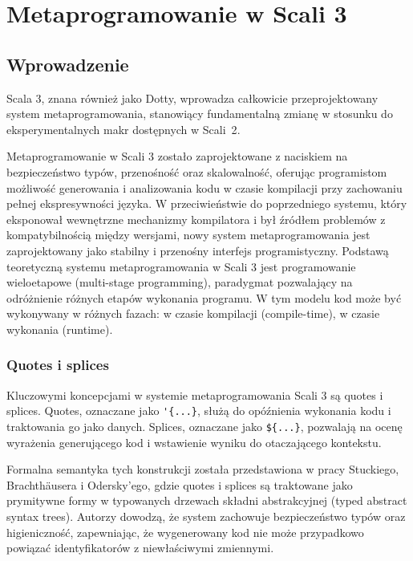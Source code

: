 \chapter{Metaprogramowanie w Scali 3}\label{ch:metaprogramowanie-w-scali-3}


\section{Wprowadzenie}\label{sec:wprowadzenie}
Scala 3, znana również jako Dotty, wprowadza całkowicie przeprojektowany system metaprogramowania, stanowiący fundamentalną zmianę w stosunku do eksperymentalnych makr dostępnych w Scali~2\cite{scala3-dropped-scala2-macros,scala3-metaprogramming}.

Metaprogramowanie w Scali 3 zostało zaprojektowane z naciskiem na bezpieczeństwo typów, przenośność oraz skalowalność, oferując programistom możliwość generowania i analizowania kodu w czasie kompilacji przy zachowaniu pełnej ekspresywności języka\cite{stucki2024infoscience,stucki2020inlining}.
W przeciwieństwie do poprzedniego systemu, który eksponował wewnętrzne mechanizmy kompilatora i był źródłem problemów z kompatybilnością między wersjami\cite{stucki2020thesis}, nowy system metaprogramowania jest zaprojektowany jako stabilny i przenośny interfejs programistyczny.
Podstawą teoretyczną systemu metaprogramowania w Scali 3 jest programowanie wieloetapowe (multi-stage programming), paradygmat pozwalający na odróżnienie różnych etapów wykonania programu\cite{scala3-staging,stucki2020thesis}.
W tym modelu kod może być wykonywany w różnych fazach: w czasie kompilacji (compile-time), w czasie wykonania (runtime)\cite{scala3-staging}.

\subsection{Quotes i splices}\label{subsec:cytaty-i-wstawki}
Kluczowymi koncepcjami w systemie metaprogramowania Scali 3 są quotes i splices\cite{stucki2018unification,stucki2021multistage}.
Quotes, oznaczane jako \verb|'{...}|, służą do opóźnienia wykonania kodu i traktowania go jako danych\cite{scala3-reflection,epfl-dotty-reflection}.
Splices, oznaczane jako \verb|${...}|, pozwalają na ocenę wyrażenia generującego kod i wstawienie wyniku do otaczającego kontekstu\cite{scala3-reflection,epfl-dotty-reflection,scala3-guides-quotes}.

Formalna semantyka tych konstrukcji została przedstawiona w pracy Stuckiego, Brachthäusera i Odersky'ego\cite{stucki2021multistage}, gdzie quotes i splices są traktowane jako prymitywne formy w typowanych drzewach składni abstrakcyjnej (typed abstract syntax trees).
Autorzy dowodzą, że system zachowuje bezpieczeństwo typów oraz higieniczność, zapewniając, że wygenerowany kod nie może przypadkowo powiązać identyfikatorów z niewłaściwymi zmiennymi\cite{stucki2021multistage}.

